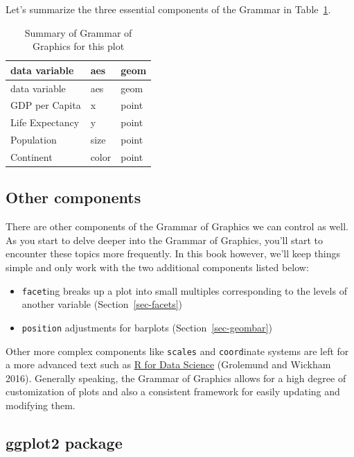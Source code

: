 \documentclass[
  letterpaper,
  DIV=11,
  numbers=noendperiod]{scrreprt}
\providecommand{\tightlist}{%
  \setlength{\itemsep}{0pt}\setlength{\parskip}{0pt}}\usepackage{longtable,booktabs,array}
\theoremstyle{definition}
\theoremstyle{remark}
\begin{document}
Let's summarize the three essential components of the Grammar in
Table~\ref{tbl-summary-gapminder}.

\hypertarget{tbl-summary-gapminder}{}
\begin{longtable}[]{@{}lll@{}}
\caption{\label{tbl-summary-gapminder}Summary of Grammar of Graphics for
this plot}\tabularnewline
\toprule()
data variable & aes & geom \\
\midrule()
\endfirsthead
\toprule()
data variable & aes & geom \\
\midrule()
\endhead
GDP per Capita & x & point \\
Life Expectancy & y & point \\
Population & size & point \\
Continent & color & point \\
\bottomrule()
\end{longtable}

\hypertarget{other-components}{%
\subsection{Other components}\label{other-components}}

There are other components of the Grammar of Graphics we can control as
well. As you start to delve deeper into the Grammar of Graphics, you'll
start to encounter these topics more frequently. In this book however,
we'll keep things simple and only work with the two additional
components listed below:

\begin{itemize}
\tightlist
\item
  \texttt{facet}ing breaks up a plot into small multiples corresponding
  to the levels of another variable (Section~\ref{sec-facets})
\item
  \texttt{position} adjustments for barplots (Section~\ref{sec-geombar})
\end{itemize}

Other more complex components like \texttt{scales} and
\texttt{coord}inate systems are left for a more advanced text such as
\href{http://r4ds.had.co.nz/data-visualisation.html\#aesthetic-mappings}{R
for Data Science} (Grolemund and Wickham 2016). Generally speaking, the
Grammar of Graphics allows for a high degree of customization of plots
and also a consistent framework for easily updating and modifying them.

\hypertarget{ggplot2-package}{%
\subsection{ggplot2 package}\label{ggplot2-package}}
\end{document}
